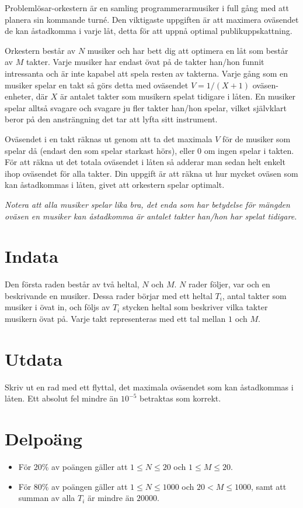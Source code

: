 
Problemlösar-orkestern är en samling programmerarmusiker i full gång med att planera sin kommande turné. Den viktigaste uppgiften är att maximera oväsendet de kan åstadkomma i varje låt, detta för att uppnå optimal publikuppskattning.

Orkestern består av $N$ musiker och har bett dig att optimera en låt som består av $M$ takter. Varje musiker har endast övat på de takter han/hon funnit intressanta och är inte kapabel att spela resten av takterna. Varje gång som en musiker spelar en takt så görs detta med oväsendet $V=1/(X+1)$ oväsen-enheter, där $X$ är antalet takter som musikern spelat tidigare i låten. En musiker spelar alltså svagare och svagare ju fler takter han/hon spelar, vilket självklart beror på den ansträngning det tar att lyfta sitt instrument.

Oväsendet i en takt räknas ut genom att ta det maximala $V$ för de musiker som spelar då (endast den som spelar starkast hörs), eller $0$ om ingen spelar i takten. För att räkna ut det totala oväsendet i låten så adderar man sedan helt enkelt ihop oväsendet för alla takter. Din uppgift är att räkna ut hur mycket oväsen som kan åstadkommas i låten, givet att orkestern spelar optimalt.

\emph{Notera att alla musiker spelar lika bra, det enda som har betydelse för mängden oväsen en musiker kan åstadkomma är antalet takter han/hon har spelat tidigare.}

\section*{Indata}
Den första raden består av två heltal, $N$ och $M$. $N$ rader följer, var och en beskrivande en musiker. Dessa rader börjar med ett heltal $T_i$, antal takter som musiker i övat in, och följs av $T_i$ stycken heltal som beskriver vilka takter musikern övat på. Varje takt representeras med ett tal mellan $1$ och $M$.

\section*{Utdata}
Skriv ut en rad med ett flyttal, det maximala oväsendet som kan åstadkommas i låten. Ett absolut fel mindre än $10^{-5}$ betraktas som korrekt.

\section*{Delpoäng}
\begin{itemize}
\item För 20\% av poängen gäller att $1 \leq N \leq 20$ och $1 \leq M \leq 20$.
\item För 80\% av poängen gäller att $1 \leq N \leq 1000$ och $20 < M \leq 1000$, samt att summan av alla $T_i$ är mindre än $20000$.
\end{itemize}

